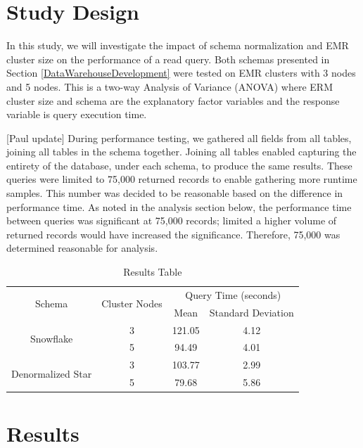 \documentclass[journal]{IEEEtran}
\begin{document}
\section{Study Design}
\label{StudyDesign}

In this study, we will investigate the impact of schema normalization and
 EMR cluster size on the performance of a read query.
Both schemas presented in Section \ref{DataWarehouseDevelopment} were tested on
 EMR clusters with 3 nodes and 5 nodes.
This is a two-way Analysis of Variance (ANOVA) where ERM cluster size and schema
 are the explanatory factor variables and the response variable is query
 execution time.


[Paul update]
During performance testing, we gathered all fields from all tables, joining all tables in the schema together. Joining all tables enabled capturing the entirety of the database, under each schema, to produce the same results. These queries were limited to 75,000 returned records to enable gathering more runtime samples. This number was decided to be reasonable based on the difference in performance time. As noted in the analysis section below, the performance time between queries was significant at 75,000 records; limited a higher volume of returned records would have increased the significance. Therefore, 75,000 was determined reasonable for analysis.

\begin{table}
	\renewcommand{\arraystretch}{1.3}
	\caption{Results Table}
	\label{ResultsTable}
	\centering
	\begin{tabular}{c c c c}
		\hline
		\hline
		\multirow{2}{*}{Schema} & \multirow{2}{*}{Cluster Nodes} &
		\multicolumn{2}{c}{Query Time (seconds)}   \\
		\cline{3-4}
		&     & Mean & Standard Deviation\\
		\hline
		\multirow{2}{*}{Snowflake}         & 3   & 121.05 & 4.12 \\
		
		& 5   & 94.49 & 4.01  \\
		
		\hline
		\multirow{2}{*}{Denormalized Star} & 3   & 103.77 & 2.99 \\
		
		& 5   & 79.68 & 5.86  \\
		
		\hline
		\hline
	\end{tabular}
\end{table}

\section{Results}
\end{document}
